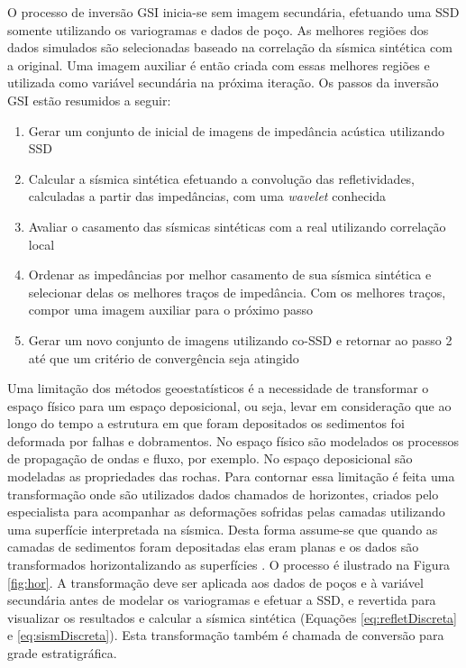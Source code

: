 O processo de inversão GSI inicia-se sem imagem secundária, efetuando uma SSD
somente utilizando os variogramas e dados de poço. As melhores regiões dos dados
simulados são selecionadas baseado na correlação da sísmica sintética com a
original. Uma imagem auxiliar é então criada com essas melhores regiões e
utilizada como variável secundária na próxima iteração. Os passos da inversão
GSI estão resumidos a seguir:

\begin{enumerate}
  \item Gerar um conjunto de inicial de imagens de impedância acústica
  utilizando SSD
  \item Calcular a sísmica sintética efetuando a convolução das refletividades,
  calculadas a partir das impedâncias, com uma \textit{wavelet} conhecida
  \item Avaliar o casamento das sísmicas sintéticas com a real utilizando
  correlação local
  \item Ordenar as impedâncias por melhor casamento de sua sísmica sintética e
  selecionar delas os melhores traços de impedância. Com os melhores traços,
  compor uma imagem auxiliar para o próximo passo
  \item Gerar um novo conjunto de imagens utilizando co-SSD e retornar ao passo
  2 até que um critério de convergência seja atingido
\end{enumerate}



Uma limitação dos métodos geoestatísticos é a necessidade de transformar o
espaço físico para um espaço deposicional, ou seja, levar em consideração que ao
longo do tempo a estrutura em que foram depositados os sedimentos foi deformada
por falhas e dobramentos. No espaço físico são modelados os processos de
propagação de ondas e fluxo, por exemplo. No espaço deposicional são modeladas
as propriedades das rochas. Para contornar essa limitação é feita uma
transformação onde são utilizados dados chamados de horizontes, criados pelo
especialista para acompanhar as deformações sofridas pelas camadas utilizando
uma superfície interpretada na sísmica. Desta forma assume-se que quando as
camadas de sedimentos foram depositadas elas eram planas e os dados são
transformados horizontalizando as superfícies \citep[p. 140]{caers2011modeling}.
O processo é ilustrado na Figura \ref{fig:hor}. A transformação deve ser
aplicada aos dados de poços e à variável secundária antes de modelar os
variogramas e efetuar a SSD, e revertida para visualizar os resultados e
calcular a sísmica sintética (Equações \ref{eq:refletDiscreta} e
\ref{eq:sismDiscreta}). Esta transformação também é chamada de conversão para
grade estratigráfica.


